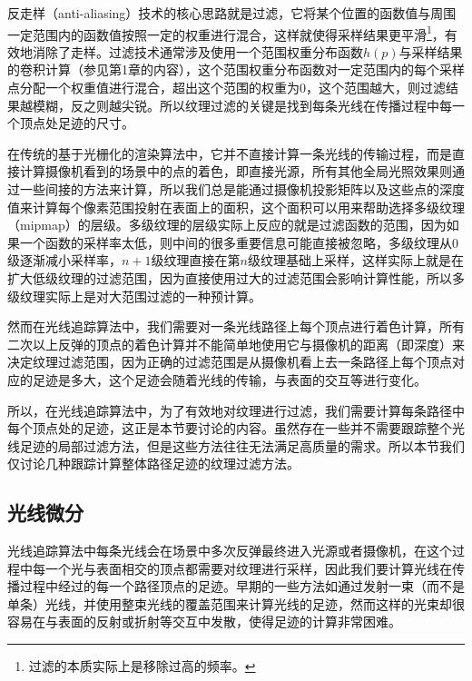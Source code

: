 反走样（anti-aliasing）技术的核心思路就是过滤，它将某个位置的函数值与周围一定范围内的函数值按照一定的权重进行混合，这样就使得采样结果更平滑\footnote{过滤的本质实际上是移除过高的频率。}，有效地消除了走样。过滤技术通常涉及使用一个范围权重分布函数$h(p)$与采样结果的卷积计算（参见第1章的内容），这个范围权重分布函数对一定范围内的每个采样点分配一个权重值进行混合，超出这个范围的权重为0，这个范围越大，则过滤结果越模糊，反之则越尖锐。所以纹理过滤的关键是找到每条光线在传播过程中每一个顶点处足迹的尺寸。

在传统的基于光栅化的渲染算法中，它并不直接计算一条光线的传输过程，而是直接计算摄像机看到的场景中的点的着色，即直接光源，所有其他全局光照效果则通过一些间接的方法来计算，所以我们总是能通过摄像机投影矩阵以及这些点的深度值来计算每个像素范围投射在表面上的面积，这个面积可以用来帮助选择多级纹理（mipmap）的层级。多级纹理的层级实际上反应的就是过滤函数的范围，因为如果一个函数的采样率太低，则中间的很多重要信息可能直接被忽略，多级纹理从$0$级逐渐减小采样率，$n+1$级纹理直接在第$n$级纹理基础上采样，这样实际上就是在扩大低级纹理的过滤范围，因为直接使用过大的过滤范围会影响计算性能，所以多级纹理实际上是对大范围过滤的一种预计算。

然而在光线追踪算法中，我们需要对一条光线路径上每个顶点进行着色计算，所有二次以上反弹的顶点的着色计算并不能简单地使用它与摄像机的距离（即深度）来决定纹理过滤范围，因为正确的过滤范围是从摄像机看上去一条路径上每个顶点对应的足迹是多大，这个足迹会随着光线的传输，与表面的交互等进行变化。

所以，在光线追踪算法中，为了有效地对纹理进行过滤，我们需要计算每条路径中每个顶点处的足迹，这正是本节要讨论的内容。虽然存在一些并不需要跟踪整个光线足迹的局部过滤方法，但是这些方法往往无法满足高质量的需求。所以本节我们仅讨论几种跟踪计算整体路径足迹的纹理过滤方法。






\subsection{光线微分}\label{sec:pt-ray-differentials}
光线追踪算法中每条光线会在场景中多次反弹最终进入光源或者摄像机，在这个过程中每一个光与表面相交的顶点都需要对纹理进行采样，因此我们要计算光线在传播过程中经过的每一个路径顶点的足迹。早期的一些方法如\cite{a:Beamtracingpolygonalobjects,a:RayTracingwithCones,a:Principlesandappli-cationsofpenciltracing}通过发射一束（而不是单条）光线，并使用整束光线的覆盖范围来计算光线的足迹，然而这样的光束却很容易在与表面的反射或折射等交互中发散，使得足迹的计算非常困难。

